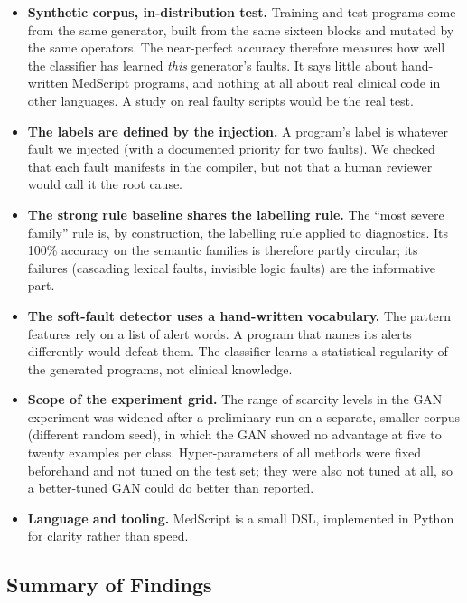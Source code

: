 \documentclass[conference]{IEEEtran}
\begin{document}
\begin{itemize}
    \item \textbf{Synthetic corpus, in-distribution test.} Training and test programs come from the same generator, built from
    the same sixteen blocks and mutated by the same operators. The near-perfect accuracy therefore measures how well the
    classifier has learned \emph{this} generator's faults. It says little about hand-written MedScript programs, and nothing at all
    about real clinical code in other languages. A study on real faulty scripts would be the real test.
    \item \textbf{The labels are defined by the injection.} A program's label is whatever fault we injected (with a documented priority
    for two faults). We checked that each fault manifests in the compiler, but not that a human reviewer would call it the root
    cause.
    \item \textbf{The strong rule baseline shares the labelling rule.} The ``most severe family'' rule is, by construction, the
    labelling rule applied to diagnostics. Its 100\% accuracy on the semantic families is therefore partly circular; its failures
    (cascading lexical faults, invisible logic faults) are the informative part.
    \item \textbf{The soft-fault detector uses a hand-written vocabulary.} The pattern features rely on a list of alert words. A
    program that names its alerts differently would defeat them. The classifier learns a statistical regularity of the generated
    programs, not clinical knowledge.
    \item \textbf{Scope of the experiment grid.} The range of scarcity levels in the GAN experiment was widened after a preliminary run on a
    separate, smaller corpus (different random seed), in which the GAN showed no advantage at five to twenty examples per class.
    Hyper-parameters of all methods were fixed beforehand and not tuned on the test set; they were also not tuned at all, so a
    better-tuned GAN could do better than reported.
    \item \textbf{Language and tooling.} MedScript is a small DSL, implemented in Python for clarity rather than speed.
\end{itemize}


\subsection{Summary of Findings}
\end{document}
